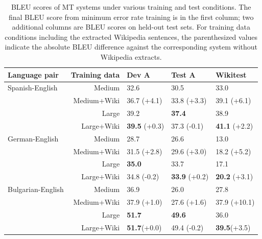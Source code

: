 \documentclass[11pt,letterpaper]{article}
\begin{document}
\begin{table}[ht!]
\begin{center}
\begin{tabular}{|lr||l||l|l|}
\hline
Language pair     & Training data     & Dev A             & Test A            & Wikitest     \\
\hline
Spanish-English   & Medium            & 32.6              & 30.5              & 33.0         \\
                  & Medium+Wiki       & 36.7 (+4.1)       & 33.8 (+3.3)       & 39.1 (+6.1)  \\
                  & Large             & 39.2              & \textbf{37.4}     & 38.9         \\
                  & Large+Wiki        &\textbf{39.5} (+0.3)&37.3 (-0.1)       & \textbf{41.1} (+2.2)  \\
\hline
German-English    & Medium            & 28.7              & 26.6              & 13.0         \\
                  & Medium+Wiki       & 31.5 (+2.8)       & 29.6 (+3.0)       & 18.2 (+5.2)  \\
                  & Large             & \textbf{35.0}     & 33.7              & 17.1         \\
                  & Large+Wiki        & 34.8 (-0.2)       &\textbf{33.9} (+0.2)&\textbf{20.2} (+3.1)  \\
\hline
Bulgarian-English & Medium            & 36.9              & 26.0              & 27.8         \\
                  & Medium+Wiki       & 37.9 (+1.0)       & 27.6 (+1.6)       & 37.9 (+10.1) \\
                  & Large             &\textbf{51.7}      &\textbf{49.6}      & 36.0         \\
                  & Large+Wiki        &\textbf{51.7}(+0.0)& 49.4 (-0.2)       &\textbf{39.5}(+3.5)  \\
\hline
\end{tabular}
\end{center}
\caption{BLEU scores of MT systems under various training and test
conditions.  The final BLEU score from minimum error rate training is in the
first column; two additional columns are BLEU scores on held-out test sets.
For training data conditions including the extracted Wikipedia sentences,
the parenthesized values indicate the absolute BLEU difference against the
corresponding system without Wikipedia extracts.}
\label{table:mtTestResults}
\end{table}
\end{document}
